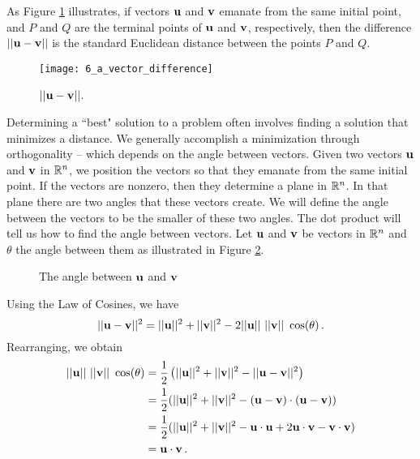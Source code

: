 As Figure \ref{F:6_a_vector_difference} illustrates, if vectors $\mathbf{u}$ and $\mathbf{v}$ emanate from the same initial point, and $P$ and $Q$ are the terminal points of $\mathbf{u}$ and $\mathbf{v}$, respectively, then the difference $|| \mathbf{u} - \mathbf{v}||$  is the standard Euclidean distance between the points $P$ and $Q$. 
\begin{figure}[ht] \centering
\texttt{[image: 6\_a\_vector\_difference]}
\caption{$|| \mathbf{u} - \mathbf{v}||$.}
\label{F:6_a_vector_difference}
\end{figure}




Determining a ``best" solution to a problem often involves finding a solution that minimizes a distance. We generally accomplish a minimization through orthogonality --  which depends on the angle between vectors. Given two vectors $\mathbf{u}$ and $\mathbf{v}$ in $\mathbb{R}^n$, we position the vectors so that they emanate from the same initial point. If the vectors are nonzero, then they determine a plane in $\mathbb{R}^n$. In that plane there are two angles that these vectors create. We will define the angle between the vectors to be the smaller of these two angles. The dot product will tell us how to find the angle between vectors. Let $\mathbf{u}$ and $\mathbf{v}$ be vectors in $\mathbb{R}^n$ and $\theta$ the angle between them as illustrated in Figure \ref{F:Angle}.
\begin{figure}[h]
\begin{center}
\end{center}
\caption{The angle between $\mathbf{u}$ and $\mathbf{v}$}
\label{F:Angle}
\end{figure}
Using the Law of Cosines, we have
\[ ||\vu-\vv||^2=||\vu||^2+||\vv||^2 - 2||\vu|| \ ||\vv|| \ \cos(\theta) \,.\]
Rearranging, we obtain 
\begin{align*}
||\mathbf{u}|| \ ||\mathbf{v}|| \ \cos(\theta) &= \frac{1}{2} \left( ||\mathbf{u}||^2+||\mathbf{v}||^2 - ||\mathbf{u}-\mathbf{v}||^2 \right) \\
&= \frac{1}{2} (||\mathbf{u}||^2+||\mathbf{v}||^2 - (\mathbf{u}-\mathbf{v})\cdot (\mathbf{u}-\mathbf{v}) )\\
&= \frac{1}{2} (||\mathbf{u}||^2+||\mathbf{v}||^2 - \mathbf{u}\cdot \mathbf{u} +2\mathbf{u} \cdot \mathbf{v} - \mathbf{v}\cdot \mathbf{v} ) \\
&= \mathbf{u} \cdot \mathbf{v}  \, .
\end{align*}
